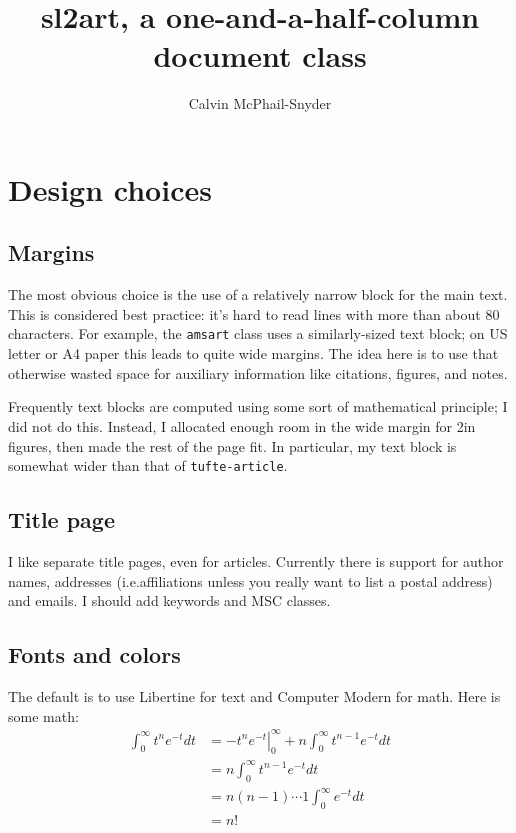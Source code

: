 \documentclass{sl2art}
\title{sl2art, a one-and-a-half-column document class}
\author{Calvin McPhail-Snyder}
\begin{document}
\maketitle
\tableofcontents

\section{Design choices}

\subsection{Margins}
The most obvious choice is the use of a relatively narrow block for the main text.
This is considered best practice: it's hard to read lines with more than about 80 characters.
For example, the \texttt{amsart} class uses a similarly-sized text block; on US letter or A4 paper this leads to quite wide margins.
The idea here is to use that otherwise wasted space for auxiliary information like citations, figures, and notes.

Frequently text blocks are computed using some sort of mathematical principle; I did not do this.
Instead, I allocated enough room in the wide margin for 2in figures, then made the rest of the page fit.
In particular, my text block is somewhat wider than that of \texttt{tufte-article}.

\subsection{Title page}
I like separate title pages, even for articles.
Currently there is support for author names, addresses (i.e.\@ affiliations unless you really want to list a postal address) and emails.
I should add keywords and MSC classes.

\subsection{Fonts and colors}
The default is to use Libertine for text and Computer Modern for math.
Here is some math:
\begin{align*}
  \int_{0}^{\infty} t^{n} e^{-t} dt
  &=
  \left.- t^{n} e^{-t} \right|_{0}^{\infty}
  +
  n \int_{0}^{\infty} t^{n-1} e^{-t} dt
  \\
  &=
  n \int_{0}^{\infty} t^{n-1} e^{-t} dt
  \\
  &= n(n-1) \cdots 1 \int_{0}^{\infty} e^{-t} dt
  \\
  &= n!
\end{align*}
\end{document}
